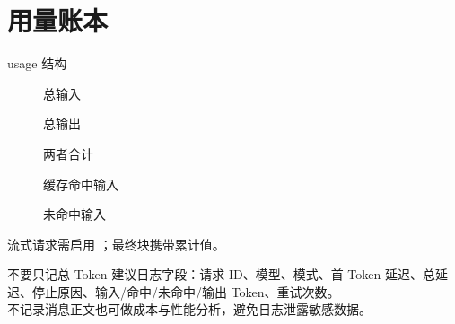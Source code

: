 \documentclass[aspectratio=169,UTF8]{ctexbeamer}
\begin{document}
\section{用量账本}
\begin{frame}{usage 结构}
\begin{description}
  \item[] 总输入
  \item[] 总输出
  \item[] 两者合计
  \item[] 缓存命中输入
  \item[] 未命中输入
\end{description}
流式请求需启用 ；最终块携带累计值。
\end{frame}
\begin{frame}{不要只记总 Token}
建议日志字段：请求 ID、模型、模式、首 Token 延迟、总延迟、停止原因、输入/命中/未命中/输出 Token、重试次数。\\[8pt]
不记录消息正文也可做成本与性能分析，避免日志泄露敏感数据。
\end{frame}
\end{document}
